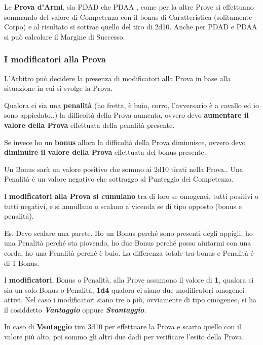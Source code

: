 \documentclass[12pt,a4paper,twoside,openany]{book}
\begin{document}
\begin{multicols}{2}
Le \textbf{Prova d'Armi}, sia PDAD che PDAA , come per la altre Prove si effettuano sommando del valore di Competenza con il bonus di Caratteristica (solitamente Corpo) e al risultato si sottrae quello del tiro di 2d10.
Anche per PDAD e PDAA si può calcolare il Margine di Successo.

\subsubsection{I modificatori alla Prova}

L'Arbitro può decidere la presenza di modificatori alla Prova in base alla situazione in cui si svolge la Prova.

Qualora ci sia una \textbf{penalità} (ho fretta, è buio, corro, l'avversario è a cavallo ed io sono appiedato..) la difficoltà della Prova aumenta, ovvero devo \textbf{aumentare il valore della Prova} effettuata della penalità presente.

Se invece ho un \textbf{bonus} allora la difficoltà della Prova diminuisce, ovvero devo \textbf{diminuire il valore della Prova} effettuata del bonus presente.

Un Bonus sarà un valore positivo che sommo ai 2d10 tirati nella Prova.. Una Penalità è un valore negativo che sottraggo al Punteggio dei Competenza.

I \textbf{modificatori alla Prova si cumulano} tra di loro se omogenei, tutti positivi o tutti negativi, e si annullano o scalano a vicenda se di tipo opposto (bonus e penalità).

Es. Devo scalare una parete. Ho un Bonus perché sono presenti degli appigli, ho una Penalità perché sta piovendo, ho due Bonus perché posso aiutarmi con una corda, ho una Penalità perché è buio. La differenza totale tra bonus e Penalità é di 1 Bonus.

I \textbf{modificatori}, Bonus o Penalità, alla Prove assumono il valore di \textbf{1}, qualora ci sia un solo Bonus o Penalità, \textbf{1d4} qualora ci siano due modificatori omogenei attivi. Nel caso i modificatori siano tre o più, ovviamente di tipo omogeneo, si ha il cosiddetto \textbf{\textit{Vantaggio}} oppure \textbf{\textit{Svantaggio}}.

In caso di \textbf{Vantaggio} tiro 3d10 per effettuare la Prova e scarto quello con il valore più alto, poi sommo gli altri due dadi per verificare l'esito della Prova.


\end{multicols}
\end{document}
